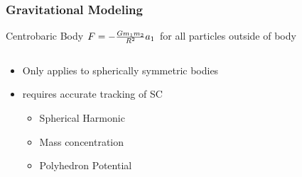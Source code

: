 \begin{frame}[noframenumbering,label=centrobaric]
\frametitle{Gravitational Modeling}
\begin{block}{Centrobaric Body}
    \( F = -\frac{G m_1 m_2}{R^2} a_1 \) for all particles outside of body
\end{block}

\begin{columns}
    \begin{column}{0.5\textwidth}
        \begin{itemize}
            \item<2-> Only applies to spherically symmetric bodies 
            \item<3->  requires accurate tracking of SC
                \begin{itemize}
                    \item Spherical Harmonic
                    \item Mass concentration
                    \item Polyhedron Potential
                \end{itemize}
        \end{itemize}
    \end{column}
    \begin{column}{0.5\textwidth}
    \end{column}
\end{columns}

\end{frame}

